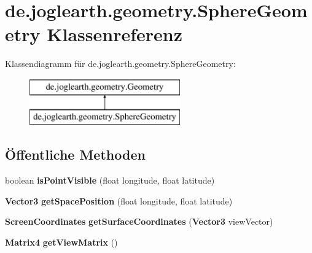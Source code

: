 \section{de.\-joglearth.\-geometry.\-Sphere\-Geometry \-Klassenreferenz}
\label{classde_1_1joglearth_1_1geometry_1_1_sphere_geometry}
\-Klassendiagramm für de.\-joglearth.\-geometry.\-Sphere\-Geometry\-:\begin{figure}[H]
\begin{center}
\leavevmode
\includegraphics[height=2.000000cm]{classde_1_1joglearth_1_1geometry_1_1_sphere_geometry}
\end{center}
\end{figure}
\subsection*{Öffentliche \-Methoden}
\begin{DoxyCompactItemize}
\item 
boolean {\bfseries is\-Point\-Visible} (float longitude, float latitude)\label{classde_1_1joglearth_1_1geometry_1_1_sphere_geometry_aa3c89f18a62d1ff65f66836f830987e2}

\item 
{\bf \-Vector3} {\bfseries get\-Space\-Position} (float longitude, float latitude)\label{classde_1_1joglearth_1_1geometry_1_1_sphere_geometry_af3f29a11beed52787c3f2e0bd12706d9}

\item 
{\bf \-Screen\-Coordinates} {\bfseries get\-Surface\-Coordinates} ({\bf \-Vector3} view\-Vector)\label{classde_1_1joglearth_1_1geometry_1_1_sphere_geometry_a59b8d62f478dde615bb2794e46fb64a7}

\item 
{\bf \-Matrix4} {\bfseries get\-View\-Matrix} ()\label{classde_1_1joglearth_1_1geometry_1_1_sphere_geometry_adaebcd9cc9c9e5c6146dd699c701cdba}

\end{DoxyCompactItemize}
